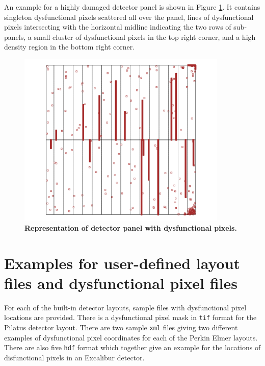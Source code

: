 \documentclass[11pt,a4paper]{article}
\begin{document}
An example for a highly damaged detector panel is shown in Figure \ref{fig_damagedPixels}.
It contains singleton dysfunctional pixels scattered all over the panel, 
lines of dysfunctional pixels intersecting with the horizontal midline indicating the two rows of sub-panels, a small cluster of dysfunctional pixels in the top right corner, and a high density region in the bottom right corner. 

\begin{figure}[htbp]
\begin{center}
\includegraphics[width=10cm]{damagedPixels.png}
\caption
{
{\bfseries Representation of detector panel with dysfunctional pixels.}
}
\label{fig_damagedPixels}
\end{center}
\end{figure}


\section{Examples for user-defined layout files and dysfunctional pixel files}\label{examples}

For each of the built-in detector layouts, sample files with dysfunctional pixel locations are provided.
There is a dysfunctional pixel mask in \texttt{tif} format for the Pilatus detector layout. There are two sample  \texttt{xml} files giving two different examples of dysfunctional pixel coordinates for each of the Perkin Elmer layouts. 
There are also five \texttt{hdf} format which together give an example for the locations of disfunctional pixels in an Excalibur detector.
\end{document}
